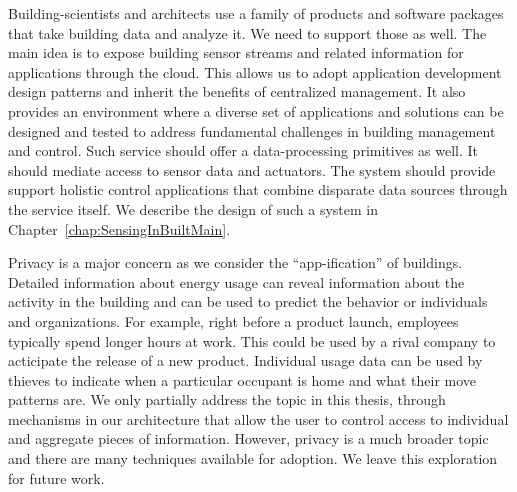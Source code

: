 Building-scientists and architects use a family of products and software packages that take building data 
and analyze it.  We need to support those as well.  The main idea is to expose building sensor streams and related information for 
applications through the cloud.  This allows us to adopt application development design patterns and inherit the benefits of 
centralized management.   It also provides an environment where a diverse set of applications and solutions can be designed
and tested to address fundamental challenges in building management and control.  %
Such service should offer a data-processing primitives as well.   It should mediate access to sensor data and actuators.
The system should provide support holistic control applications that combine disparate data sources through the service itself.
We describe the design of such a system in Chapter~\ref{chap:SensingInBuiltMain}.

Privacy is a major concern as we consider the ``app-ification'' of buildings.  Detailed information about energy usage can reveal 
information about the activity in the building and can be used to predict the behavior or individuals and organizations.  For example, 
right before a product launch, employees typically spend longer hours at work.  This could be used by a rival company to acticipate
the release of a new product.  Individual usage data can be used by thieves to indicate when a particular occupant is home and what their
move patterns are.  We only partially address the topic in this thesis,
through mechanisms in our architecture that allow the user to control access to individual and aggregate pieces of information.
However, privacy is a much broader topic and there are many techniques available for adoption.  We leave this exploration
for future work.


